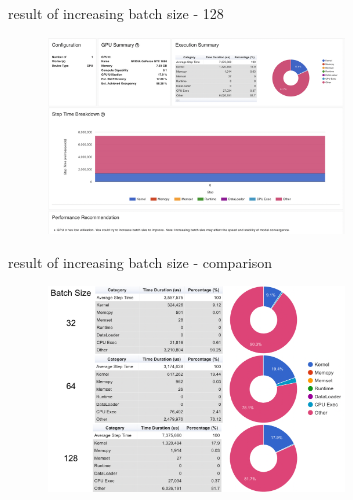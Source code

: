 \documentclass[compress,aspectratio=169]{beamer}
\begin{document}
\begin{frame}{result of increasing batch size - 128}
	\vspace{-1em}
\begin{center}
    \begin{figure}
        \includegraphics[width=0.7\textwidth]{../../data/scap_gtx1080_profiler-torch_batch-size-128_14650759}
    \end{figure}
    \end{center}

\end{frame}


\begin{frame}{result of increasing batch size - comparison}
    \vspace{-1em}
\begin{center}
    \begin{figure}
        \includegraphics[width=0.7\textwidth]{../../data/scap_gtx1080_profiler-torch_comparison-batch-size}
    \end{figure}
    \end{center}

\end{frame}
\end{document}
